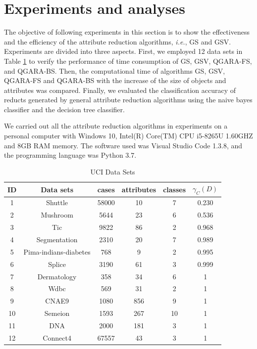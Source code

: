 \documentclass[review]{elsarticle}
\begin{document}
\section{Experiments and analyses}\label{exps}
	\par The objective of following experiments in this section is to show the effectiveness and the efficiency of the attribute reduction algorithms, \emph{i.e.}, GS and GSV. Experiments are divided into three aspects. First, we employed 12 data sets in Table \ref{uci} to verify the performance of time consumption of GS, GSV, QGARA-FS, and QGARA-BS. Then, the computational time of algorithms GS, GSV, QGARA-FS and QGARA-BS with the increase of the size of objects and attributes was compared. Finally, we evaluated the classification accuracy of reducts generated by general attribute reduction algorithms using the naive bayes classifier and the decision tree classifier.
	\par We carried out all the attribute reduction algorithms in experiments on a personal computer with Windows 10, Intel(R) Core(TM) CPU i5-8265U 1.60GHZ and 8GB RAM memory. The software used was Visual Studio Code 1.3.8, and the programming language was Python 3.7.
	\begin{table}[htbp]
		\caption{UCI Data Sets}
		\label{uci}
		\begin{center}
			\begin{tabular}{cccccc}
				\hline
				ID & Data sets                  & cases& attributes & classes & $\gamma_C(D)$ \\ \hline
				1  & Shuttle           		    & 58000 & 10         & 7       & 0.230        \\
				2  & Mushroom                   & 5644  & 23         & 6       & 0.536        \\
				3  & Tic	                    & 9822  & 86         & 2       & 0.968        \\
				4  & Segmentation	     	    & 2310  & 20         & 7       & 0.989        \\
				5  & Pima-indians-diabetes		& 768   & 9          & 2       & 0.995        \\
				6  & Splice                     & 3190  & 61         & 3       & 0.999        \\
				7  & Dermatology                & 358   & 34         & 6       & 1             \\
				8  & Wdbc                  		& 569   & 31         & 2       & 1             \\
				9  & CNAE9                      & 1080  & 856        & 9       & 1             \\
				10 & Semeion                    & 1593  & 267        & 10      & 1             \\
				11 & DNA                        & 2000  & 181        & 3       & 1             \\
				12 & Connect4                   & 67557 & 43         & 3       & 1             \\
				\hline
			\end{tabular}
		\end{center}
	\end{table}
\end{document}
